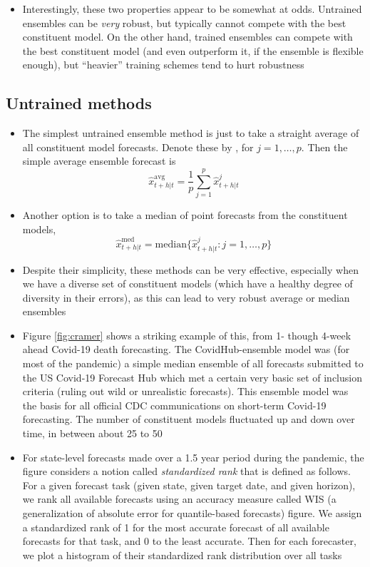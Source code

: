 \documentclass{article}
\begin{document}
\begin{itemize}
\item Interestingly, these two properties appear to be somewhat at odds.
  Untrained ensembles can be \emph{very} robust, but typically cannot compete
  with the best constituent model. On the other hand, trained ensembles can
  compete with the best constituent model (and even outperform it, if the
  ensemble is flexible enough), but ``heavier'' training schemes tend to hurt
  robustness  
\end{itemize}

\subsection{Untrained methods}

\begin{itemize}
\item The simplest untrained ensemble method is just to take a straight average
  of all constituent model forecasts. Denote these by
  , for $j = 1,\dots,p$. Then the simple average
  ensemble forecast is 
  \[
  \hat{x}^{\text{avg}}_{t+h|t} = \frac{1}{p} \sum_{j=1}^p \hat{x}^j_{t+h|t} 
  \] 

\item Another option is to take a median of point forecasts from the constituent
  models,
  \[
  \hat{x}^{\text{med}}_{t+h|t} = \mathrm{median}\Big\{ \hat{x}^j_{t+h|t} : j =
  1,\dots,p \Big\} 
  \]

\item Despite their simplicity, these methods can be very effective, especially
  when we have a diverse set of constituent models (which have a healthy degree
  of diversity in their errors), as this can lead to very robust average or
  median ensembles

\item Figure \ref{fig:cramer} shows a striking example of this, from 1- though
  4-week ahead Covid-19 death forecasting. The CovidHub-ensemble model was (for 
  most of the pandemic) a simple median ensemble of all forecasts submitted to
  the US Covid-19 Forecast Hub which met a certain very basic set of inclusion
  criteria (ruling out wild or unrealistic forecasts). This ensemble model was
  the basis for all official CDC communications on short-term Covid-19
  forecasting. The number of constituent models fluctuated up and down over
  time, in between about 25 to 50   

\item For state-level forecasts made over a 1.5 year period during the pandemic, 
  the figure considers a notion called \emph{standardized rank} that is defined
  as follows. For a given forecast task (given state, given target date, and
  given horizon), we rank all available forecasts using an accuracy measure
  called WIS (a generalization of absolute error for quantile-based forecasts)
  figure. We assign a standardized rank of 1 for the most accurate forecast of
  all available forecasts for that task, and 0 to the least accurate. Then for
  each forecaster, we plot a histogram of their standardized rank distribution
  over all tasks  


\end{itemize}
\end{document}
